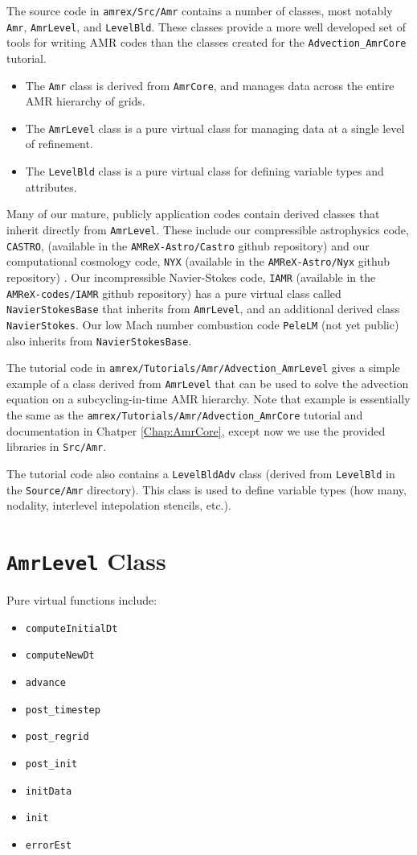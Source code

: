 The source code in {\tt amrex/Src/Amr} contains a number of classes, most notably
{\tt Amr}, {\tt AmrLevel}, and {\tt LevelBld}.
These classes provide a more well developed set of tools for writing AMR codes
than the classes created for the {\tt Advection\_AmrCore} tutorial.
\begin{itemize}
\item The {\tt Amr} class is derived from {\tt AmrCore}, and manages data across the 
entire AMR hierarchy of grids.
\item The {\tt AmrLevel} class is a pure virtual class for managing data at a
single level of refinement.
\item The {\tt LevelBld} class is a pure virtual class for defining variable types
and attributes.
\end{itemize}

Many of our mature, publicly application codes contain derived classes that inherit directly
from {\tt AmrLevel}.  These include our compressible astrophysics code,
{\tt CASTRO},
(available in the {\tt AMReX-Astro/Castro} github repository) 
 and our computational cosmology code, {\tt NYX}
(available in the {\tt AMReX-Astro/Nyx} github repository)   .
Our incompressible Navier-Stokes code, {\tt IAMR}
(available in the {\tt AMReX-codes/IAMR} github repository)
has a pure virtual class called {\tt NavierStokesBase} that inherits from {\tt AmrLevel},
and an additional derived class {\tt NavierStokes}.
Our low Mach number combustion code {\tt PeleLM} (not yet public) also inherits
from {\tt NavierStokesBase}.

The tutorial code in {\tt amrex/Tutorials/Amr/Advection\_AmrLevel} gives a simple
example of a class derived from {\tt AmrLevel} that can be used to solve
the advection equation on a subcycling-in-time AMR hierarchy.  Note that example
is essentially the same as the {\tt amrex/Tutorials/Amr/Advection\_AmrCore} tutorial
and documentation in Chatper \ref{Chap:AmrCore}, except now we use the provided
libraries in {\tt Src/Amr}.

The tutorial code also contains a {\tt LevelBldAdv} class (derived from {\tt LevelBld} in the
{\tt Source/Amr} directory).  This class is used to define variable types (how many, nodality,
interlevel intepolation stencils, etc.).


\section{{\tt AmrLevel} Class}
Pure virtual functions include:
\begin{itemize}
\item {\tt computeInitialDt}
\item {\tt computeNewDt}
\item {\tt advance}
\item {\tt post\_timestep}
\item {\tt post\_regrid}
\item {\tt post\_init}
\item {\tt initData}
\item {\tt init}
\item {\tt errorEst}
\end{itemize}

